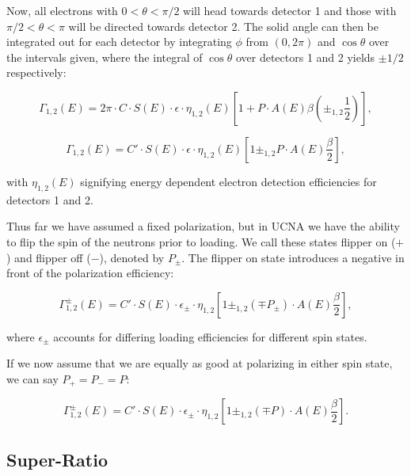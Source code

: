Now, all electrons with $0 < \theta < \pi/2$ will head towards detector 1 and those 
with $\pi/2 < \theta < \pi$ will be directed towards detector 2. The solid angle can
then be integrated out for each detector by integrating $\phi$ from $(0,2\pi)$ and $\cos\theta$ over the intervals given, where the integral of $\cos\theta$ over detectors
1 and 2 yields $\pm1/2$ respectively: 

\begin{equation} 
\Gamma_{1,2}\left(E\right)= 2\pi \cdot C \cdot S(E) \cdot \epsilon \cdot \eta_{1,2}(E) \left[ 1+ P\cdot A(E)\beta \left(\pm_{1,2}\frac{1}{2}\right) \right],
\end{equation} 

\begin{equation} 
\Gamma_{1,2}\left(E\right)=C' \cdot S(E) \cdot \epsilon \cdot \eta_{1,2}(E) \left[ 1 \pm_{1,2} P\cdot A(E) \frac{\beta}{2} \right],
\end{equation} 

\noindent with $\eta_{1,2}(E)$ signifying energy dependent electron detection efficiencies for detectors 1 and 2. 

Thus far we have assumed a fixed polarization, but in UCNA we have the ability to 
flip the spin of the neutrons prior to loading. We call these states flipper on ($+$) 
and flipper off ($-$), denoted by $P_{\pm}$. The flipper on state introduces a negative in front of the polarization efficiency:

\begin{equation}
\Gamma_{1,2}^{\pm}\left(E\right)=C' \cdot S(E) \cdot \epsilon_{\pm} \cdot \eta_{1,2} \left[ 1 \pm_{1,2} 
\left(\mp P_{\pm}\right) \cdot A(E) \frac{\beta}{2} \right],
\end{equation} 

\noindent where $\epsilon_{\pm}$ accounts for differing loading efficiencies for 
different spin states.

If we now assume that we are equally as good at polarizing in either spin state, we
can say $P_{+}=P_{-}=P$:

\begin{equation}
\Gamma_{1,2}^{\pm}\left(E\right)=C' \cdot S(E) \cdot \epsilon_{\pm} \cdot \eta_{1,2} \left[ 1 \pm_{1,2} 
\left(\mp P \right) \cdot A(E) \frac{\beta}{2} \right].
\end{equation}


\subsection{Super-Ratio}

